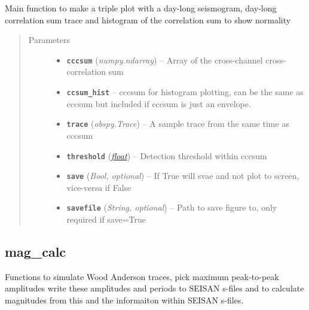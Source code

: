 \documentclass[a4paper,10pt,english]{sphinxmanual}
\begin{document}

\begin{fulllineitems}
\label{utils:EQcorrscan_plotting.triple_plot}
Main function to make a triple plot with a day-long seismogram, day-long
correlation sum trace and histogram of the correlation sum to show normality
\begin{quote}\begin{description}
\item[{Parameters}] \leavevmode\begin{itemize}
\item {} 
\textbf{\texttt{cccsum}} (\emph{numpy.ndarray}) -- Array of the cross-channel cross-correlation sum

\item {} 
\textbf{\texttt{ccsum\_hist}} -- cccsum for histogram plotting, can be the same as cccsum                    but included if cccsum is just an envelope.

\item {} 
\textbf{\texttt{trace}} (\emph{obspy.Trace}) -- A sample trace from the same time as cccsum

\item {} 
\textbf{\texttt{threshold}} (\href{https://docs.python.org/library/functions.html\#float}{\emph{float}}) -- Detection threshold within cccsum

\item {} 
\textbf{\texttt{save}} (\emph{Bool, optional}) -- If True will svae and not plot to screen, vice-versa if False

\item {} 
\textbf{\texttt{savefile}} (\emph{String, optional}) -- Path to save figure to, only required if save=True

\end{itemize}

\end{description}\end{quote}

\end{fulllineitems}



\subsection{mag\_calc}
\label{utils:module-mag_calc}\label{utils:mag-calc}
Functions to simulate Wood Anderson traces, pick maximum peak-to-peak amplitudes
write these amplitudes and periods to SEISAN s-files and to calculate magnitudes
from this and the informaiton within SEISAN s-files.
\end{document}
